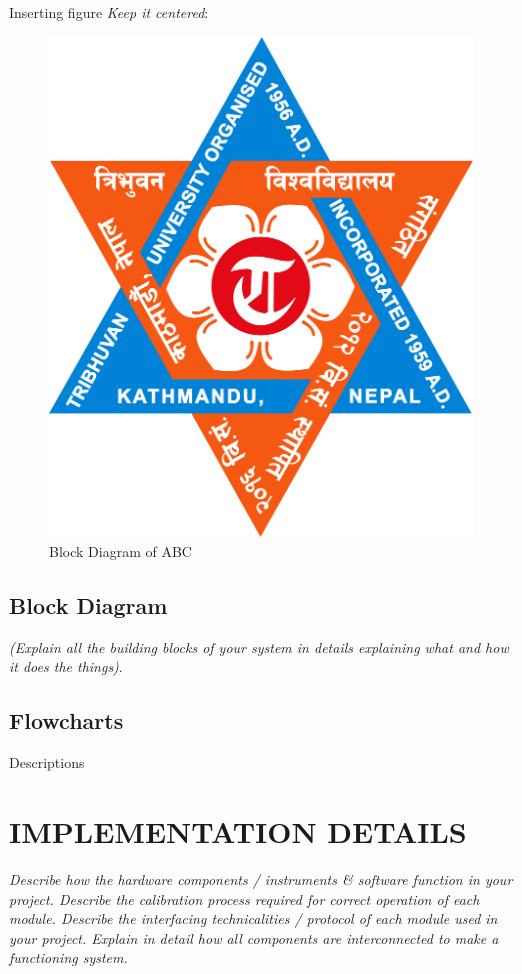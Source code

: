 \documentclass{ioereport}
\begin{document}
    Inserting figure \textit{Keep it centered}:\\
    \begin{figure}[H]
        \centering
        \includegraphics[scale=0.1]{TU_Logo.jpg}
        \caption{Block Diagram of ABC}
        \label{fig:logotu}
    \end{figure}

    \subsection{Block Diagram}
    \textit{(Explain all the building blocks of your system in details explaining what and how it does the things)}.

    \subsection{Flowcharts}
    Descriptions

    \pagebreak

\section{\MakeUppercase{Implementation Details}}
    \textit{Describe how the hardware components / instruments \& software function in your project. Describe the calibration process required for correct operation of each module. Describe the interfacing technicalities / protocol of each module used in your project. Explain in detail how all components are interconnected to make a functioning system.}
\end{document}
